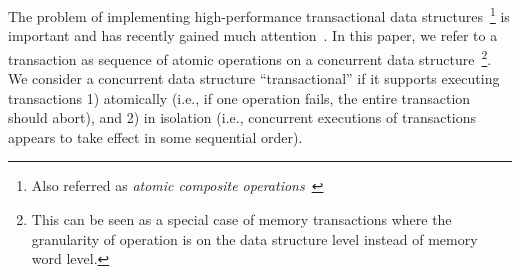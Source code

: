 \documentclass[10pt,conference,compsocconf]{IEEEtran}
\begin{document}
The problem of implementing high-performance transactional data structures~\footnote{Also referred as \emph{atomic composite operations}~\cite{golan2013concurrent}} is important and has recently gained much attention~\cite{golan2013concurrent,bronson2010transactional,herlihy2008transactional,gramoli2013composing,golan2015automatic,hassan2014integrating,koskinen2010coarse}. 
In this paper, we refer to a transaction as sequence of atomic operations on a concurrent data structure~\footnote{This can be seen as a special case of memory transactions where the granularity of operation is on the data structure level instead of memory word level.}.
We consider a concurrent data structure ``transactional'' if it supports executing transactions 1) atomically (i.e., if one operation fails, the entire transaction should abort), and 2) in isolation (i.e., concurrent executions of transactions appears to take effect in some sequential order).
\end{document}

